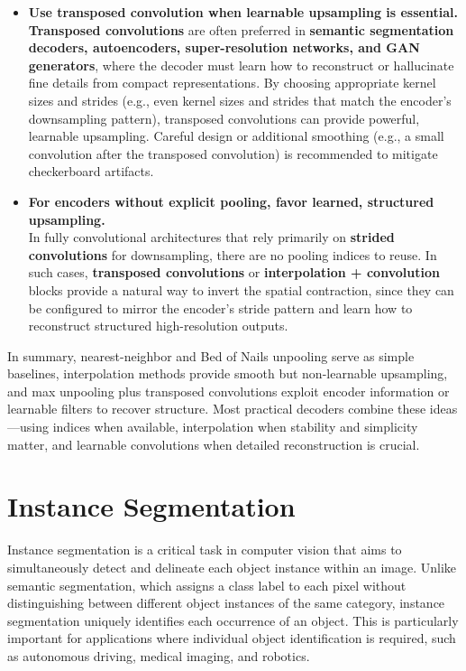 \begin{itemize}
	\item \textbf{Use transposed convolution when learnable upsampling is essential.} \\
	\textbf{Transposed convolutions} are often preferred in \textbf{semantic segmentation decoders, autoencoders, super-resolution networks, and GAN generators}, where the decoder must learn how to reconstruct or hallucinate fine details from compact representations. By choosing appropriate kernel sizes and strides (e.g., even kernel sizes and strides that match the encoder’s downsampling pattern), transposed convolutions can provide powerful, learnable upsampling. Careful design or additional smoothing (e.g., a small convolution after the transposed convolution) is recommended to mitigate checkerboard artifacts.
	
	\item \textbf{For encoders without explicit pooling, favor learned, structured upsampling.} \\
	In fully convolutional architectures that rely primarily on \textbf{strided convolutions} for downsampling, there are no pooling indices to reuse. In such cases, \textbf{transposed convolutions} or \textbf{interpolation + convolution} blocks provide a natural way to invert the spatial contraction, since they can be configured to mirror the encoder’s stride pattern and learn how to reconstruct structured high-resolution outputs.
\end{itemize}

\noindent
In summary, nearest-neighbor and Bed of Nails unpooling serve as simple baselines, interpolation methods provide smooth but non-learnable upsampling, and max unpooling plus transposed convolutions exploit encoder information or learnable filters to recover structure. Most practical decoders combine these ideas—using indices when available, interpolation when stability and simplicity matter, and learnable convolutions when detailed reconstruction is crucial.

\section{Instance Segmentation}

\noindent Instance segmentation is a critical task in computer vision that aims to simultaneously detect and delineate each object instance within an image. Unlike semantic segmentation, which assigns a class label to each pixel without distinguishing between different object instances of the same category, instance segmentation uniquely identifies each occurrence of an object. This is particularly important for applications where individual object identification is required, such as autonomous driving, medical imaging, and robotics.

